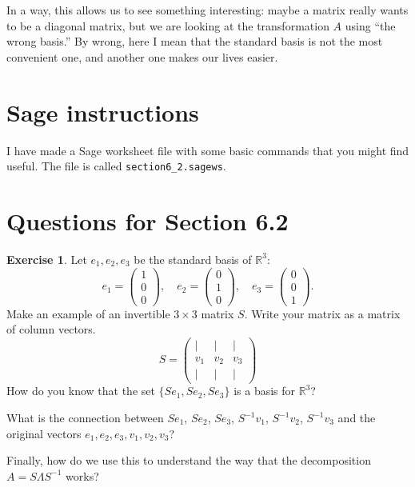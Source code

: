\documentclass[11pt]{amsart}
\theoremstyle{definition}
\newtheorem{exercise}{Exercise}
\begin{document}
In a way, this allows us to see something interesting: maybe a matrix really wants to be a diagonal matrix, but we are looking at the transformation $A$ using ``the wrong basis.'' By wrong, here I mean that the standard basis is not the most convenient one, and another one makes our lives easier.

\section{Sage instructions}

I have made a Sage worksheet file with some basic commands that you might find useful. The file is called \texttt{section6\_2.sagews}.


\section{Questions for Section 6.2}
\setcounter{exercise}{146}



\begin{exercise}
Let $e_1, e_2, e_3$ be the standard basis of $\mathbb{R}^3$:
\[
e_1 = \begin{pmatrix} 1 \\ 0 \\ 0 \end{pmatrix}, \quad e_2 = \begin{pmatrix} 0 \\ 1 \\ 0 \end{pmatrix}, \quad e_3 = \begin{pmatrix} 0 \\ 0 \\ 1 \end{pmatrix}.
\]
Make an example of an invertible $3 \times 3$ matrix $S$. Write your matrix as a matrix of column vectors.
\[
S = \begin{pmatrix} | & | & | \\
v_1 & v_2 & v_3 \\
| & | & |
\end{pmatrix}
\]
How do you know that the set $\{ Se_1, Se_2, Se_3 \}$ is a basis for $\mathbb{R}^3$?

What is the connection between $Se_1$, $Se_2$, $Se_3$, $S^{-1}v_1$, $S^{-1}v_2$, $S^{-1}v_3$ and the original vectors $e_1, e_2, e_3, v_1, v_2, v_3$?

Finally, how do we use this to understand the way that the decomposition $A = S\Lambda S^{-1}$ works?
\end{exercise}
\end{document}
